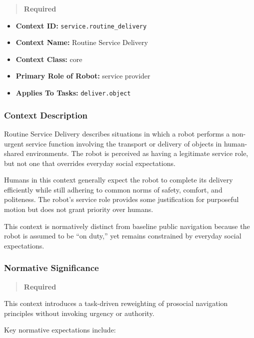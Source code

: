 \documentclass[utf8]{frontiers_suppmat} %
\providecommand{\tightlist}{%
  \setlength{\itemsep}{0pt}\setlength{\parskip}{0pt}}
\begin{document}
\begin{quote}
\textbf{Required}
\end{quote}

\begin{itemize}
\tightlist
\item
  \textbf{Context ID:}
  \texttt{service.routine\_delivery}
\item
  \textbf{Context Name:} Routine Service Delivery
\item
  \textbf{Context Class:} core
\item
  \textbf{Primary Role of Robot:} service provider
\item
  \textbf{Applies To Tasks:} \texttt{deliver.object}
\end{itemize}

\subsubsection{Context Description}\label{context-description}

Routine Service Delivery describes situations in which a robot performs
a non-urgent service function involving the transport or delivery of
objects in human-shared environments. The robot is perceived as having a
legitimate service role, but not one that overrides everyday social
expectations.

Humans in this context generally expect the robot to complete its
delivery efficiently while still adhering to common norms of safety,
comfort, and politeness. The robot's service role provides some
justification for purposeful motion but does not grant priority over
humans.

This context is normatively distinct from baseline public navigation
because the robot is assumed to be ``on duty,'' yet remains constrained
by everyday social expectations.

\subsubsection{Normative Significance}\label{normative-significance}

\begin{quote}
\textbf{Required}
\end{quote}

This context introduces a task-driven reweighting of prosocial
navigation principles without invoking urgency or authority.

Key normative expectations include:
\end{document}
